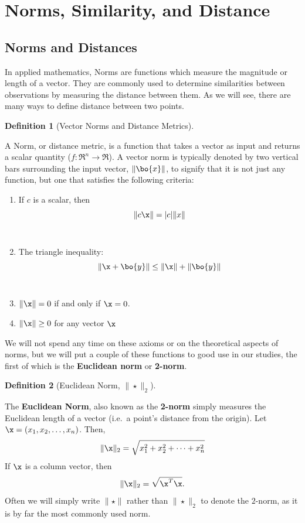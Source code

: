 \documentclass[
]{article}
\providecommand{\tightlist}{%
  \setlength{\itemsep}{0pt}\setlength{\parskip}{0pt}}
\theoremstyle{definition}
\newtheorem{definition}{Definition}[section]
\theoremstyle{definition}
\theoremstyle{definition}
\theoremstyle{definition}
\theoremstyle{remark}
\begin{document}
\hypertarget{norms}{%
\section{Norms, Similarity, and Distance}\label{norms}}

\hypertarget{sec-norms}{%
\subsection{Norms and Distances}\label{sec-norms}}

In applied mathematics, Norms are functions which measure the magnitude or length of a vector. They are commonly used to determine similarities between observations by measuring the distance between them. As we will see, there are many ways to define distance between two points.

\begin{definition}[Vector Norms and Distance Metrics]
\protect\hypertarget{def:normdef}{}\label{def:normdef}

A Norm, or distance metric, is a function that takes a vector as input and returns a scalar quantity (\(f: \Re^n \to \Re\)). A vector norm is typically denoted by two vertical bars surrounding the input vector, \(\|\bo{x}\|\), to signify that it is not just any function, but one that satisfies the following criteria:

\begin{enumerate}
\def\labelenumi{\arabic{enumi}.}
\tightlist
\item
  If \(c\) is a scalar, then \[\|c\x\|=|c|\|x\|\]\\
\item
  The triangle inequality: \[\|\x+\bo{y}\| \leq \|\x\|+\|\bo{y}\|\]\\
\item
  \(\|\x\|=0\) if and only if \(\x=0\).\\
\item
  \(\|\x\|\geq 0\) for any vector \(\x\)\\
\end{enumerate}

\end{definition}

We will not spend any time on these axioms or on the theoretical aspects of norms, but we will put a couple of these functions to good use in our studies, the first of which is the \textbf{Euclidean norm} or \textbf{2-norm}.



\begin{definition}[Euclidean Norm, \(\|\star\|_2\)]
\protect\hypertarget{def:twonormdef}{}\label{def:twonormdef}

The \textbf{Euclidean Norm}, also known as the \textbf{2-norm} simply measures the Euclidean length of a vector (i.e.~a point's distance from the origin). Let \(\x = (x_1,x_2,\dots,x_n)\). Then,
\[\|\x\|_2 = \sqrt{x_1^2 + x_2^2 + \dots + x_n^2} \]
If \(\x\) is a column vector, then \[\|\x\|_2= \sqrt{\x^T\x}.\]
Often we will simply write \(\|\star\|\) rather than \(\|\star\|_2\) to denote the \(2\)-norm, as it is by far the most commonly used norm.

\end{definition}
\end{document}

